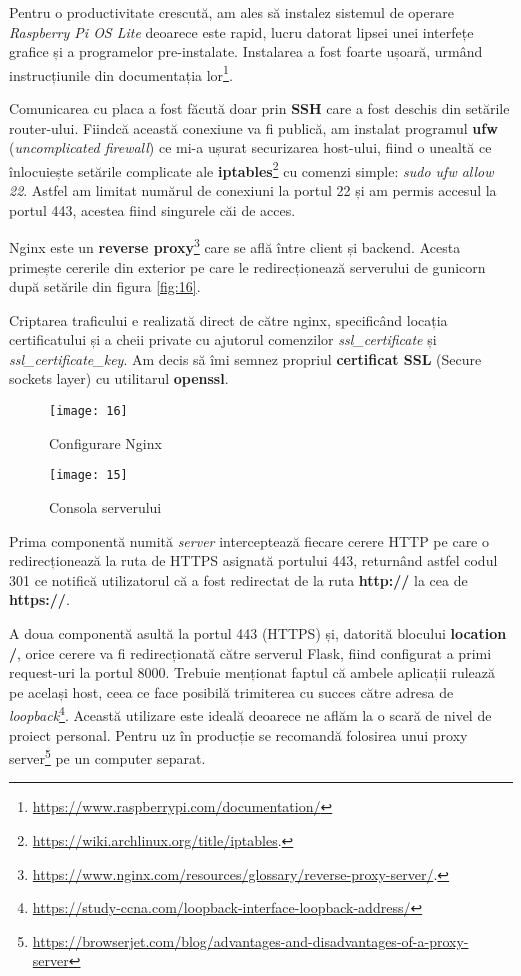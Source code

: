 Pentru o productivitate crescută, am ales să instalez sistemul de operare \emph{Raspberry Pi OS Lite} deoarece este rapid, lucru datorat lipsei unei interfețe grafice și a programelor pre-instalate. Instalarea a fost foarte ușoară, urmând instrucțiunile din documentația lor\footnote{\url{https://www.raspberrypi.com/documentation/}}.

Comunicarea cu placa a fost făcută doar prin \textbf{SSH} care a fost deschis din setările router-ului. Fiindcă această conexiune va fi publică, am instalat programul \textbf{ufw} (\emph{uncomplicated firewall}) ce mi-a ușurat securizarea host-ului, fiind o unealtă ce înlocuiește setările complicate ale \textbf{iptables}\footnote{\url{https://wiki.archlinux.org/title/iptables}.} cu comenzi simple: \emph{sudo ufw allow 22}. Astfel am limitat numărul de conexiuni la portul 22 și am permis accesul la portul 443, acestea fiind singurele  căi de acces.

Nginx este un \textbf{reverse proxy}\footnote{\url{https://www.nginx.com/resources/glossary/reverse-proxy-server/}.} care se află între client și backend. Acesta primește cererile din exterior pe care le redirecționează serverului de gunicorn după setările din figura \ref{fig:16}.

Criptarea traficului e realizată direct de către nginx, specificând locația certificatului și a cheii private cu ajutorul comenzilor \emph{ssl\_certificate} și \emph{ssl\_certificate\_key}. Am decis să îmi semnez propriul \textbf{certificat SSL} (Secure sockets layer) cu utilitarul \textbf{openssl}.

\begin{figure}[h]
	\centering
	\begin{minipage}{0.45\textwidth}
		\centering
		\texttt{[image: 16]}
		\caption{Configurare Nginx}
		\label{fig:16}
	\end{minipage}
	\hfill
	\begin{minipage}{0.45\textwidth}
		\centering
		\texttt{[image: 15]}
		\caption{Consola serverului}
		\label{fig:15}
	\end{minipage}
\end{figure}

Prima componentă numită \emph{server} interceptează fiecare cerere HTTP pe care o redirecționează la ruta de HTTPS asignată portului 443, returnând astfel codul 301 ce notifică utilizatorul că a fost redirectat de la ruta \textbf{http://} la cea de \textbf{https://}.

A doua componentă asultă la portul 443 (HTTPS) și, datorită blocului \textbf{location /}, orice cerere va fi redirecționată către serverul Flask, fiind configurat a primi request-uri la portul 8000. Trebuie menționat faptul că ambele aplicații rulează pe același host, ceea ce face posibilă trimiterea cu succes către adresa de \emph{loopback}\footnote{\url{https://study-ccna.com/loopback-interface-loopback-address/}}. Această utilizare este ideală deoarece ne aflăm la o scară de nivel de proiect personal. Pentru uz în producție se recomandă folosirea unui proxy server\footnote{\url{https://browserjet.com/blog/advantages-and-disadvantages-of-a-proxy-server}} pe un computer separat.

